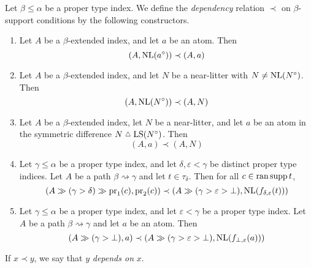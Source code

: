 \begin{definition}
    \label{def:dependency}
    Let \( \beta \leq \alpha \) be a proper type index.
    We define the \emph{dependency} relation \( \prec \) on \( \beta \)-support conditions by the following constructors.
    \begin{enumerate}
        \item Let \( A \) be a \( \beta \)-extended index, and let \( a \) be an atom.
        Then
        \[ (A, \operatorname{NL}(a^\circ)) \prec (A, a) \]
        \item Let \( A \) be a \( \beta \)-extended index, and let \( N \) be a near-litter with \( N \neq \operatorname{NL}(N^\circ) \).
        Then
        \[ (A, \operatorname{NL}(N^\circ)) \prec (A, N) \]
        \item Let \( A \) be a \( \beta \)-extended index, let \( N \) be a near-litter, and let \( a \) be an atom in the symmetric difference \( N \symmdiff \LS(N^\circ) \).
        Then
        \[ (A, a) \prec (A, N) \]
        \item Let \( \gamma \leq \alpha \) be a proper type index, and let \( \delta, \varepsilon < \gamma \) be distinct proper type indices.
        Let \( A \) be a path \( \beta \rightsquigarrow \gamma \) and let \( t \in \tau_\delta \).
        Then for all \( c \in \operatorname{ran} \operatorname{supp} t \),
        \[ (A \gg (\gamma > \delta) \gg \operatorname{pr}_1(c), \operatorname{pr}_2(c)) \prec (A \gg (\gamma > \varepsilon > \bot), \operatorname{NL}(f_{\delta,\varepsilon}(t))) \]
        \item Let \( \gamma \leq \alpha \) be a proper type index, and let \( \varepsilon < \gamma \) be a proper type index.
        Let \( A \) be a path \( \beta \rightsquigarrow \gamma \) and let \( a \) be an atom.
        Then
        \[ (A \gg (\gamma > \bot), a) \prec (A \gg (\gamma > \varepsilon > \bot), \operatorname{NL}(f_{\bot,\varepsilon}(a))) \]
    \end{enumerate}
    If \( x \prec y \), we say that \( y \) \emph{depends on} \( x \).
\end{definition}

